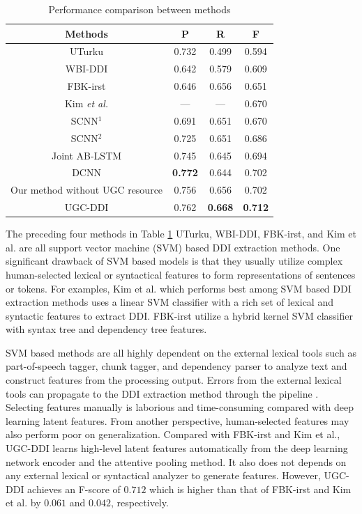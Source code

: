 \documentclass[conference]{IEEEtran}
\begin{document}
\begin{table}
\caption{Performance comparison between methods}
\normalsize
\label{table:comp}
\centering
\begin{tabular}{cccc}
\hline
 Methods & P & R & F \\ \hline
 UTurku \cite{bjorne_uturku:_2013} & 0.732 &  0.499 &  0.594\\
 WBI-DDI \cite{thomas_wbi-ddi:_2013} & 0.642 &  0.579 &  0.609 \\
 FBK-irst \cite{chowdhury_fbk-irst:_2013} &  0.646 & 0.656 & 0.651\\
 Kim \emph{et al.} \cite{kim_extracting_2015} & --- & --- &  0.670\\
  SCNN$^1$ \cite{zhao_drug_2016} &  0.691 & 0.651 & 0.670\\
 SCNN$^2$ \cite{zhao_drug_2016} &  0.725 & 0.651 & 0.686\\
 Joint AB-LSTM \cite{sahu_drug-drug_2017} &  0.745 & 0.645 & 0.694\\
 DCNN \cite{liu_dependency-based_2016} & \textbf{0.772} & 0.644 & 0.702 \\
 Our method without UGC resource & 0.756 & 0.656 & 0.702 \\
 UGC-DDI & 0.762 & \textbf{0.668} & \textbf{0.712} \\\hline
\end{tabular}
\end{table}

The preceding four methods in Table \ref{table:comp} UTurku, WBI-DDI, FBK-irst, and Kim et al. are all support vector machine (SVM) based DDI extraction methods.
One significant drawback of SVM based models is that they usually utilize complex human-selected lexical or
syntactical features to form representations of sentences or tokens.
For examples, Kim et al. which performs best among SVM based DDI extraction methods uses a linear SVM classifier
with a rich set of lexical and syntactic features to extract DDI.
FBK-irst utilize a hybrid kernel SVM classifier with syntax tree and dependency tree features.

SVM based methods are all highly dependent on the external lexical tools such as part-of-speech tagger,
chunk tagger, and dependency parser to analyze text and construct features from the processing output.
Errors from the external lexical tools can propagate to the DDI extraction method through the pipeline \cite{jiao_chinese_2018}.
Selecting features manually is laborious and time-consuming compared with deep learning latent features.
From another perspective, human-selected features may also perform poor on generalization.
Compared with FBK-irst and Kim et al., UGC-DDI learns high-level latent features automatically from the deep learning network encoder
and the attentive pooling method.
It also does not depends on any external lexical or syntactical analyzer to generate features.
However, UGC-DDI achieves an F-score of $0.712$ which is higher than that of FBK-irst and Kim et al. by $0.061$ and $0.042$, respectively.
\end{document}
